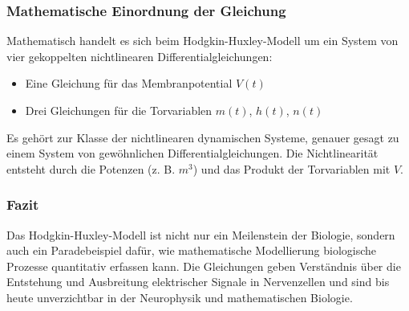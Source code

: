 \subsubsection{Mathematische Einordnung der Gleichung}
Mathematisch handelt es sich beim Hodgkin-Huxley-Modell um ein System von vier gekoppelten nichtlinearen
Differentialgleichungen:
\begin{itemize}
    \item Eine Gleichung für das Membranpotential $V(t)$
    \item Drei Gleichungen für die Torvariablen $m(t)$, $h(t)$, $n(t)$
\end{itemize}
Es gehört zur Klasse der nichtlinearen dynamischen Systeme, genauer gesagt zu einem System von gewöhnlichen Differentialgleichungen. Die Nichtlinearität entsteht durch die Potenzen (z. B. $m^3$) und das Produkt der Torvariablen mit $V$.
\subsubsection{Fazit}
Das Hodgkin-Huxley-Modell ist nicht nur ein Meilenstein der Biologie, sondern auch ein Paradebeispiel dafür, wie mathematische Modellierung biologische Prozesse quantitativ erfassen kann. Die Gleichungen geben Verständnis über die Entstehung und Ausbreitung elektrischer Signale in Nervenzellen und sind bis heute unverzichtbar in der Neurophysik und mathematischen Biologie.

